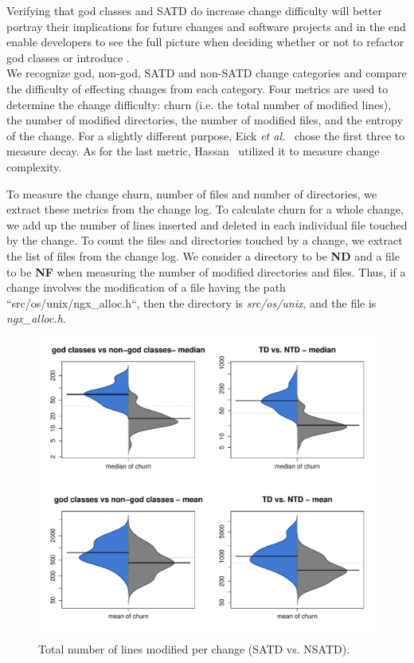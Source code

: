 Verifying that god classes and SATD do increase change difficulty will better portray their implications for future changes and software projects and in the end enable developers to see the full picture when deciding whether or not to refactor god classes or introduce \SATD. \\

We recognize god, non-god, SATD and non-SATD change categories and compare the difficulty of effecting changes from each category. Four metrics are used to determine the change difficulty: churn (i.e. the total number of modified lines), the number of modified directories, the number of modified files, and the entropy of the change. For a slightly different purpose, Eick \emph{et al.}~\cite{eick2001decay} chose the first three to measure decay. As for the last metric, Hassan~\cite{hassan2009predicting} utilized it to measure change complexity.


To measure the change churn, number of files and number of directories, we extract these metrics from the change log. To calculate churn for a whole change, we add up the number of lines inserted and deleted in each individual file touched by the change. To count the files and directories touched by a change, we extract the list of files from the change log. We consider a directory to be \textbf{ND} and a file to be \textbf{NF} when measuring the number of modified directories and files. Thus, if a change involves the modification of a file having the path ``src/os/unix/ngx\_alloc.h``, then the directory is \textit{src/os/unix}, and the file is \textit{ngx\_alloc.h}.\\



\begin{figure}[tb!]
	\centering
	\includegraphics[width=120mm]{figures/chapter4/rq3_distribution_of_churn}
	\caption{Total number of lines modified per change (SATD vs. NSATD).}
	\label{figure:ch4_tlcpc}
\end{figure}




